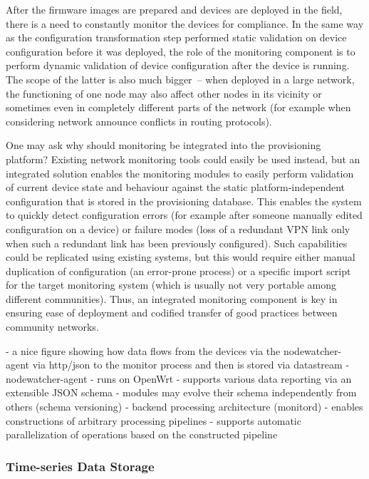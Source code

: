 \documentclass[5p,sort&compress]{elsarticle}
\begin{document}
After the firmware images are prepared and devices are deployed in the field, there is a need to constantly monitor the devices for compliance.
In the same way as the configuration transformation step performed static validation on device configuration before it was deployed, the role of the monitoring component is to perform dynamic validation of device configuration after the device is running.
The scope of the latter is also much bigger~-- when deployed in a large network, the functioning of one node may also affect other nodes in its vicinity or sometimes even in completely different parts of the network (for example when considering network announce conflicts in routing protocols).

One may ask why should monitoring be integrated into the provisioning platform?
Existing network monitoring tools could easily be used instead, but an integrated solution enables the monitoring modules to easily perform validation of current device state and behaviour against the static platform-independent configuration that is stored in the provisioning database.
This enables the system to quickly detect configuration errors (for example after someone manually edited configuration on a device) or failure modes (loss of a redundant VPN link only when such a redundant link has been previously configured).
Such capabilities could be replicated using existing systems, but this would require either manual duplication of configuration (an error-prone process) or a specific import script for the target monitoring system (which is usually not very portable among different communities).
Thus, an integrated monitoring component is key in ensuring ease of deployment and codified transfer of good practices between community networks.

- a nice figure showing how data flows from the devices via the nodewatcher-agent via http/json to the monitor process and then is stored via datastream
- nodewatcher-agent
  - runs on OpenWrt
  - supports various data reporting via an extensible JSON schema
  - modules may evolve their schema independently from others (schema versioning)
- backend processing architecture (monitord)
  - enables constructions of arbitrary processing pipelines
  - supports automatic parallelization of operations based on the constructed pipeline

\subsubsection{Time-series Data Storage}
\end{document}
